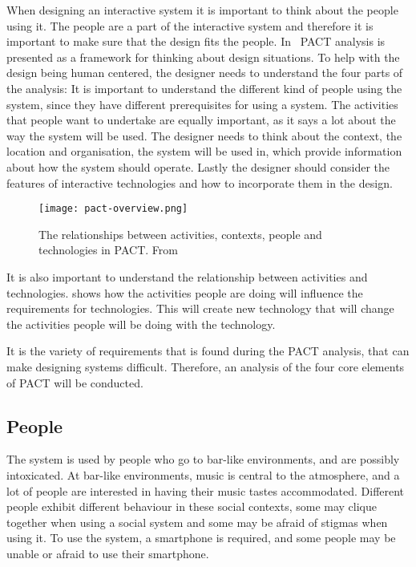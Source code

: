 When designing an interactive system it is important to think about the people using it. The people are a part of the interactive system and therefore it is important to make sure that the design fits the people. In~\cite{benyon2013designing} PACT analysis is presented as a framework for thinking about design situations. To help with the design being human centered, the designer needs to understand the four parts of the analysis: It is important to understand the different kind of people using the system, since they have different prerequisites for using a system. The activities that people want to undertake are equally important, as it says a lot about the way the system will be used. The designer needs to think about the context, the location and organisation, the system will be used in, which provide information about how the system should operate. Lastly the designer should consider the features of interactive technologies and how to incorporate them in the design.

\begin{figure}
  \centering
  \texttt{[image: pact-overview.png]}
  \caption{The relationships between activities, contexts, people and technologies in PACT. From~\cite{benyon2013designing}}
  \label{fig:pact-overview}
\end{figure}

It is also important to understand the relationship between activities and technologies.  shows how the activities people are doing will influence the requirements for technologies. This will create new technology that will change the activities people will be doing with the technology.

It is the variety of requirements that is found during the PACT analysis, that can make designing systems difficult. Therefore, an analysis of the four core elements of PACT will be conducted.


\subsection{People}
\label{sub:pact_people}

The system is used by people who go to bar-like environments, and are possibly intoxicated. At bar-like environments, music is central to the atmosphere, and a lot of people are interested in having their music tastes accommodated. Different people exhibit different behaviour in these social contexts, some may clique together when using a social system and some may be afraid of stigmas when using it. To use the system, a smartphone is required, and some people may be unable or afraid  to use their smartphone.

